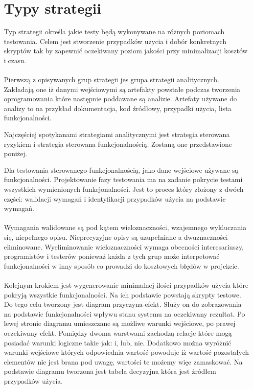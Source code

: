 \section{Typy strategii}
Typ strategii określa jakie testy będą wykonywane na różnych poziomach testowania. Celem jest stworzenie przypadków użycia i dobór konkretnych skryptów tak by zapewnić oczekiwany poziom jakości przy minimalizacji kosztów i czasu.
\paragraph{}
Pierwszą z opisywanych grup strategii jes grupa strategii analitycznych. Zakładają one iż danymi wejściowymi są artefakty powstałe podczas tworzenia oprogramowania które następnie poddawane są analizie. Artefaty używane do analizy to na przykład dokumentacja, kod źródłowy, przypadki użycia, lista funkcjonalności.

Najczęściej spotykanami strategiami analitycznymi jest strategia sterowana ryzykiem i strategia sterowana funkcjonalnością. Zostaną one przedstawione poniżej.

Dla testowania sterowanego funkcjonalnością, jako dane wejściowe używane są funkcjonalności. Projektowanie fazy testowania ma na zadanie pokrycie testami wszystkich wymienionych funkcjonalności. Jest to proces który złożony z dwóch części: walidacji wymagań i identyfikacji przypadków użycia na podstawie wymagań. 
\paragraph{}
Wymagania walidowane są pod kątem wieloznaczności, wzajemnego wykluczania się, niepełnego opisu. Nieprecyzyjne opisy są uzupełniane a dwuznaczności eliminowane. Wyeliminowanie wieloznaczności wymaga obecności interesariuszy, programistów i testerów ponieważ każda z tych grup może interpetować funkcjonalności w inny sposób co prowadzi do kosztowych błędów w projekcie.
\paragraph{}
Kolejnym krokiem jest wygenerowanie minimalnej ilości przypadków użycia które pokryją wszystkie funkcjonalności. Na ich podstawie powstają skrypty testowe. Do tego celu tworzony jest diagram przyczyna-efekt. Służy on do zobrazowania na podstawie funkcjonalności wpływu stanu systemu na oczekiwany rezultat. Po lewej stronie diagramu umieszczane są możliwe warunki wejściowe, po prawej oczekiwany efekt. Pomiędzy dwoma warstwami zachodzą relacje które mogą posiadać warunki logiczne takie jak: i, lub, nie. Dodatkowo można wyróżnić warunki wejściowe których odpowiednia wartość powoduje iż wartość pozostałych elementów nie jest brana pod uwagę, wartości te możemy więc zamaskować. Na podstawie diagramu tworzona jest tabela decyzyjna która jest źródłem przypadków użycia.
